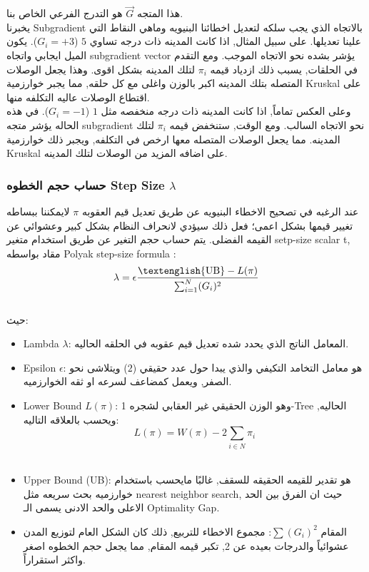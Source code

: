 \documentclass{article}
\newcommand{\en}[1]{\textenglish{#1}}
\begin{document}
هذا المتجه $\vec{G}$ هو التدرج الفرعي الخاص بنا.\\

يخبرنا \en{Subgradient} بالاتجاه الذي يجب سلكه لتعديل اخطائنا البنيويه وماهي النقاط التي علينا تعديلها. على سبيل المثال, اذا كانت المدينه ذات درجه تساوي $5$ ($G_i = +3$). يكون الميل ايجابي واتجاه \en{subgradient vector} يؤشر بشده نحو الاتجاه الموجب. ومع التقدم في الحلقات, يسبب ذلك ازدياد قيمه $\pi_i$ لتلك المدينه بشكل اقوى. وهذا يجعل الوصلات المتصله بتلك المدينه اكبر بالوزن واغلى مع كل حلقه, مما يجبر خوارزمية \en{Kruskal} على اقتطاع الوصلات عاليه التكلفه منها.\\

وعلى العكس تماماً, اذا كانت المدينه ذات درجه منخفصه مثل $1$ ($G_i = -1$). في هذه الحاله يؤشر متجه \en{subgradient} نحو الاتجاه السالب. ومع الوقت, ستنخفض قيمه $\pi_i$ لتلك المدينه. مما يجعل الوصلات المتصله معها ارخص في التكلفه, ويجبر ذلك خوارزمية \en{Kruskal} على اضافه المزيد من الوصلات لتلك المدينه.\\

\subsubsection{حساب حجم الخطوه \en{Step Size $\lambda$}}
عند الرغبه في تصحيح الاخطاء البنيويه عن طريق تعديل قيم العقوبه $\pi$ لايمكننا ببساطه تغيير قيمها بشكل اعمى؛ فعل ذلك سيؤدي لانحراف النظام بشكل كبير وعشوائي عن القيمه الفضلى. يتم حساب حجم التغير عن طريق استخدام متغير \en{setp-size scalar t}, مقاد بواسطه
	\en{Polyak step-size formula} :\\

	{\LARGE$$
	\lambda = \epsilon \frac{\text{\en{UB}} - L(\pi)}{\sum_{i=1}^{N}(G_i)^2}
	$$}\\

حيث:
	\begin{itemize}
		\item \en{Lambda $\lambda$}:
المعامل الناتج الذي يحدد شده تعديل قيم عقوبه في الحلقه الحاليه.
		\item \en{Epsilon $\epsilon$}:
هو معامل التخامد التكيفي والذي يبدا حول عدد حقيقي ($2$) ويتلاشى نحو الصفر, ويعمل كمضاعف لسرعه او ثقه الخوارزميه.
		\item \en{Lower Bound $L(\pi)$}:
وهو الوزن الحقيقي غير العقابي لشجره \en{1-Tree} الحاليه, ويحسب بالعلاقه التاليه:\\

{\LARGE$$
L(\pi) = W(\pi) - 2 \sum_{i \in N} \pi_i
$$}\\

		\item \en{Upper Bound (UB)}:
هو تقدير للقيمه الحقيقه للسقف, غالبًا مايحسب باستخدام خوارزميه بحث سريعه مثل \en{nearest neighbor search}, حيث ان الفرق بين الحد الاعلى والحد الادنى يسمى الـ \en{Optimality Gap}.
		\item المقام $\sum (G_i)^2$:
		مجموع الاخطاء للتربيع, ذلك كان الشكل العام لتوزيع المدن عشوائياً والدرجات بعيده عن 2, تكبر قيمه المقام, مما يجعل حجم الخطوه اصغر واكثر استقراراً.

	\end{itemize}
\end{document}
